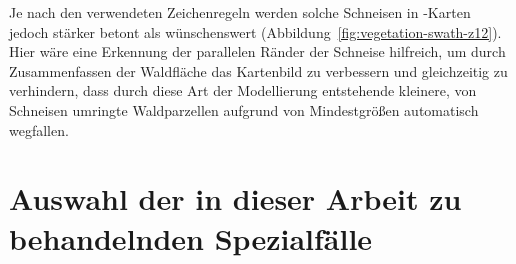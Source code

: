 \documentclass[../main/thesis.tex]{subfiles}
\begin{document}

Je nach den verwendeten Zeichenregeln werden solche Schneisen in \osm-Karten jedoch stärker betont als wünschenswert (Abbildung~\ref{fig:vegetation-swath-z12}).
Hier wäre eine Erkennung der parallelen Ränder der Schneise hilfreich, um durch Zusammenfassen der Waldfläche das Kartenbild zu verbessern und gleichzeitig zu verhindern, dass durch diese Art der Modellierung entstehende kleinere, von Schneisen umringte Waldparzellen aufgrund von Mindestgrößen automatisch wegfallen.







\section{Auswahl der in dieser Arbeit zu behandelnden Spezialfälle}
\label{ch:case-selection}
\end{document}
